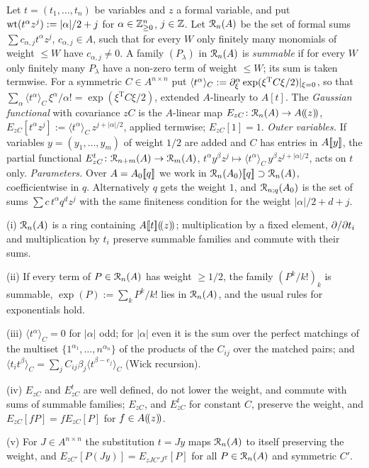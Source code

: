 \begin{defn}
\label{def:fsp-ring}
Let $t=(t_1,\dots,t_n)$ be variables and $z$ a formal variable, and put $\operatorname{wt}(t^\alpha z^j):=|\alpha|/2+j$ for $\alpha\in\mathbb{Z}_{\geq0}^n$, $j\in\mathbb{Z}$. Let $\mathcal{R}_n(A)$ be the set of formal sums $\sum c_{\alpha,j}t^\alpha z^j$, $c_{\alpha,j}\in A$, such that for every $W$ only finitely many monomials of weight $\leq W$ have $c_{\alpha,j}\neq0$. A family $(P_\lambda)$ in $\mathcal{R}_n(A)$ is \emph{summable} if for every $W$ only finitely many $P_\lambda$ have a non-zero term of weight $\leq W$; its sum is taken termwise. For a symmetric $C\in A^{n\times n}$ put $\langle t^\alpha\rangle_C:=\partial_\xi^\alpha\exp(\xi^{\mathrm T}C\xi/2)|_{\xi=0}$, so that $\sum_\alpha\langle t^\alpha\rangle_C\,\xi^\alpha/\alpha!=\exp(\xi^{\mathrm T}C\xi/2)$, extended $A$-linearly to $A[t]$. The \emph{Gaussian functional} with covariance $zC$ is the $A$-linear map $E_{zC}\colon\mathcal{R}_n(A)\to A(\!(z)\!)$, $E_{zC}[t^\alpha z^j]:=\langle t^\alpha\rangle_C\,z^{j+|\alpha|/2}$, applied termwise; $E_{zC}[1]=1$.
\emph{Outer variables.} If variables $y=(y_1,\dots,y_m)$ of weight $1/2$ are added and $C$ has entries in $A[\![ y ]\!]$, the partial functional $E^t_{zC}\colon\mathcal{R}_{n+m}(A)\to\mathcal{R}_m(A)$, $t^\alpha y^\beta z^j\mapsto\langle t^\alpha\rangle_C\,y^\beta z^{j+|\alpha|/2}$, acts on $t$ only.
\emph{Parameters.} Over $A=A_0[\![ q ]\!]$ we work in $\mathcal{R}_n(A_0)[\![ q ]\!]\supset\mathcal{R}_n(A)$, coefficientwise in $q$. Alternatively $q$ gets the weight $1$, and $\mathcal{R}_{n;q}(A_0)$ is the set of sums $\sum c\,t^\alpha q^dz^j$ with the same finiteness condition for the weight $|\alpha|/2+d+j$.
\end{defn}

\begin{lem}
\label{lem:fsp-ring}
(i) $\mathcal{R}_n(A)$ is a ring containing $A[\![ t ]\!](\!(z)\!)$; multiplication by a fixed element, $\partial/\partial t_i$ and multiplication by $t_i$ preserve summable families and commute with their sums.

(ii) If every term of $P\in\mathcal{R}_n(A)$ has weight $\geq1/2$, the family $(P^k/k!)_k$ is summable, $\exp(P):=\sum_kP^k/k!$ lies in $\mathcal{R}_n(A)$, and the usual rules for exponentials hold.

(iii) $\langle t^\alpha\rangle_C=0$ for $|\alpha|$ odd; for $|\alpha|$ even it is the sum over the perfect matchings of the multiset $\{1^{\alpha_1},\dots,n^{\alpha_n}\}$ of the products of the $C_{ij}$ over the matched pairs; and $\langle t_it^\beta\rangle_C=\sum_jC_{ij}\beta_j\langle t^{\beta-e_j}\rangle_C$ (Wick recursion).

(iv) $E_{zC}$ and $E^t_{zC}$ are well defined, do not lower the weight, and commute with sums of summable families; $E_{zC}$, and $E^t_{zC}$ for constant $C$, preserve the weight, and $E_{zC}[fP]=fE_{zC}[P]$ for $f\in A(\!(z)\!)$.

(v) For $J\in A^{n\times n}$ the substitution $t=Jy$ maps $\mathcal{R}_n(A)$ to itself preserving the weight, and $E_{zC'}[P(Jy)]=E_{zJC'J^{\mathrm T}}[P]$ for all $P\in\mathcal{R}_n(A)$ and symmetric $C'$.
\end{lem}

